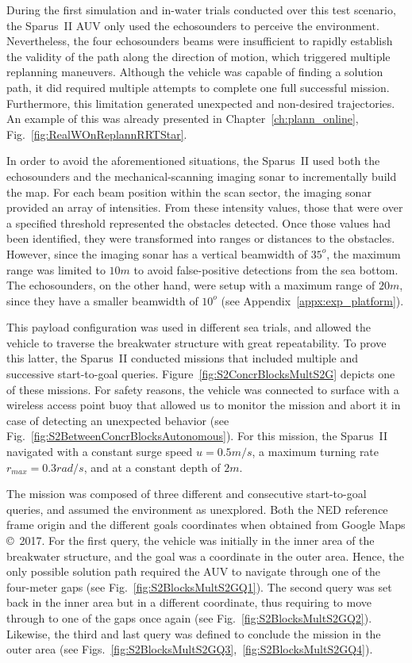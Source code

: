 During the first simulation and in-water trials conducted over this test
scenario, the Sparus~II \ac{AUV} only used the echosounders to perceive the
environment. Nevertheless, the four echosounders beams were insufficient to
rapidly establish the validity of the path along the direction of motion, which
triggered multiple replanning maneuvers. Although the vehicle was capable of
finding a solution path, it did required multiple attempts to complete one
full successful mission. Furthermore, this limitation generated unexpected and
non-desired trajectories. An example of this was already presented in
Chapter~\ref{ch:plann_online}, Fig.~\ref{fig:RealWOnReplannRRTStar}.

In order to avoid the aforementioned situations, the Sparus~II used both the
echosounders and the mechanical-scanning imaging sonar to incrementally build
the map. For each beam position within the scan sector, the imaging sonar
provided an array of intensities. From these intensity values, those that were
over a specified threshold represented the obstacles detected. Once those values
had been identified, they were transformed into ranges or distances to the
obstacles. However, since the imaging sonar has a vertical beamwidth of $35^o$,
the maximum range was limited to $10m$ to avoid false-positive detections from
the sea bottom. The echosounders, on the other hand, were setup with a maximum
range of $20m$, since they have a smaller beamwidth of $10^o$ (see
Appendix~\ref{appx:exp_platform}).

This payload configuration was used in different sea trials, and allowed the
vehicle to traverse the breakwater structure with great repeatability. To prove
this latter, the Sparus~II conducted missions that included multiple and
successive start-to-goal queries. Figure~\ref{fig:S2ConcrBlocksMultS2G} depicts
one of these missions. For safety reasons, the vehicle was connected to surface
with a wireless access point buoy that allowed us to monitor the mission and
abort it in case of detecting an unexpected behavior (see
Fig.~\ref{fig:S2BetweenConcrBlocksAutonomous}). For this mission, the
Sparus~II navigated with a constant surge speed $u=0.5m/s$, a maximum turning
rate $r_{max}=0.3rad/s$, and at a constant depth of $2m$. 

The mission was composed of three different and consecutive start-to-goal
queries, and assumed the environment as unexplored. Both the \ac{NED} reference
frame origin and the different goals coordinates when obtained from Google Maps
\copyright~2017. For the first query, the vehicle was initially in the inner
area of the breakwater structure, and the goal was a coordinate in the outer
area. Hence, the only possible solution path required the \ac{AUV}
to navigate through one of the four-meter gaps (see
Fig.~\ref{fig:S2BlocksMultS2GQ1}). The second query was set back in the inner
area but in a different coordinate, thus requiring to move through to one of the
gaps once again (see Fig.~\ref{fig:S2BlocksMultS2GQ2}). Likewise, the third and
last query was defined to conclude the mission in the outer area
(see Figs.~\ref{fig:S2BlocksMultS2GQ3},~\ref{fig:S2BlocksMultS2GQ4}).

